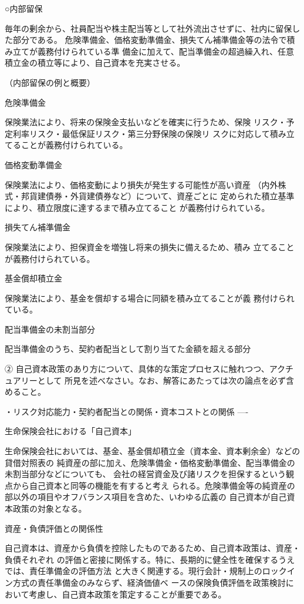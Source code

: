 \documentclass[report,gutter=10mm,fore-edge=10mm,uplatex,dvipdfmx]{jlreq}
\begin{document}
○内部留保

毎年の剰余から、社員配当や株主配当等として社外流出させずに、社内に留保した部分である。
危険準備金、価格変動準備金、損失てん補準備金等の法令で積み立てが義務付けられている準
備金に加えて、配当準備金の超過繰入れ、任意積立金の積立等により、自己資本を充実させる。

（内部留保の例と概要）

危険準備金

保険業法により、将来の保険金支払いなどを確実に行うため、保険
リスク・予定利率リスク・最低保証リスク・第三分野保険の保険リ
スクに対応して積み立てることが義務付けられている。

価格変動準備金

保険業法により、価格変動により損失が発生する可能性が高い資産
（内外株式・邦貨建債券・外貨建債券など）について、資産ごとに
定められた積立基準により、積立限度に達するまで積み立てること
が義務付けられている。

損失てん補準備金

保険業法により、担保資金を増強し将来の損失に備えるため、積み
立てることが義務付けられている。

基金償却積立金

保険業法により、基金を償却する場合に同額を積み立てることが義
務付けられている。

配当準備金の未割当部分

配当準備金のうち、契約者配当として割り当てた金額を超える部分

② 自己資本政策のあり方について、具体的な策定プロセスに触れつつ、アクチュアリーとして
所見を述べなさい。なお、解答にあたっては次の論点を必ず含めること。

・リスク対応能力・契約者配当との関係・資本コストとの関係
----

生命保険会社における「自己資本」

生命保険会社においては、基金、基金償却積立金（資本金、資本剰余金）などの貸借対照表の
純資産の部に加え、危険準備金・価格変動準備金、配当準備金の未割当部分などについても、
会社の経営資金及び諸リスクを担保するという観点から自己資本と同等の機能を有すると考え
られる。危険準備金等の純資産の部以外の項目やオフバランス項目を含めた、いわゆる広義の
自己資本が自己資本政策の対象となる。

資産・負債評価との関係性

自己資本は、資産から負債を控除したものであるため、自己資本政策は、資産・負債それぞれ
の評価と密接に関係する。特に、長期的に健全性を確保するうえでは、責任準備金の評価方法
と大きく関連する。現行会計・規制上のロックイン方式の責任準備金のみならず、経済価値ベ
ースの保険負債評価を政策検討において考慮し、自己資本政策を策定することが重要である。
\end{document}
